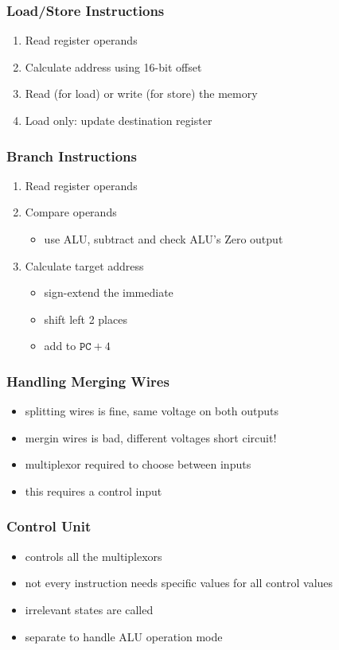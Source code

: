 \documentclass{article}
\begin{document}
\subsubsection{Load/Store Instructions}
\begin{enumerate}
	\item Read register operands
	\item Calculate address using 16-bit offset
	\item Read (for load) or write (for store) the memory
	\item Load only: update destination register
\end{enumerate}
\subsubsection{Branch Instructions}
\begin{enumerate}
	\item Read register operands
	\item Compare operands \begin{itemize}
		\item use ALU, subtract and check ALU's Zero output 
	\end{itemize}
	\item Calculate target address \begin{itemize}
		\item sign-extend the immediate
		\item shift left 2 places
		\item add to $\texttt{PC}+4$
	\end{itemize}
\end{enumerate}
\subsubsection{Handling Merging Wires}
\begin{itemize}
	\item splitting wires is fine, same voltage on both outputs
	\item mergin wires is bad, different voltages \Rightarrow short circuit!
	\item multiplexor required to choose between inputs
	\item this requires a control input
\end{itemize}
\subsubsection{Control Unit}
\begin{itemize}
	\item controls all the multiplexors
	\item not every instruction needs specific values for all control values
	\item irrelevant states are called 
	\item separate  to handle ALU operation mode
\end{itemize}
\end{document}
